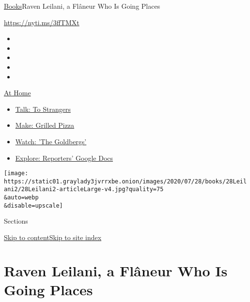 \href{/section/books}{Books}\textbar{}Raven Leilani, a Flâneur Who Is
Going Places

\url{https://nyti.ms/3ffTMXt}

\begin{itemize}
\item
\item
\item
\item
\item
\end{itemize}

\href{https://www.nytimes3xbfgragh.onion/spotlight/at-home?action=click\&pgtype=Article\&state=default\&region=TOP_BANNER\&context=at_home_menu}{At
Home}

\begin{itemize}
\tightlist
\item
  \href{https://www.nytimes3xbfgragh.onion/2020/08/03/well/family/the-benefits-of-talking-to-strangers.html?action=click\&pgtype=Article\&state=default\&region=TOP_BANNER\&context=at_home_menu}{Talk:
  To Strangers}
\item
  \href{https://www.nytimes3xbfgragh.onion/2020/08/01/at-home/coronavirus-make-pizza-on-a-grill.html?action=click\&pgtype=Article\&state=default\&region=TOP_BANNER\&context=at_home_menu}{Make:
  Grilled Pizza}
\item
  \href{https://www.nytimes3xbfgragh.onion/2020/07/31/arts/television/goldbergs-abc-stream.html?action=click\&pgtype=Article\&state=default\&region=TOP_BANNER\&context=at_home_menu}{Watch:
  'The Goldbergs'}
\item
  \href{https://www.nytimes3xbfgragh.onion/interactive/2020/at-home/even-more-reporters-editors-diaries-lists-recommendations.html?action=click\&pgtype=Article\&state=default\&region=TOP_BANNER\&context=at_home_menu}{Explore:
  Reporters' Google Docs}
\end{itemize}

\texttt{[image: https://static01.graylady3jvrrxbe.onion/images/2020/07/28/books/28Leilani2/28Leilani2-articleLarge-v4.jpg?quality=75\\\&auto=webp\\\&disable=upscale]}

Sections

\protect\hyperlink{site-content}{Skip to
content}\protect\hyperlink{site-index}{Skip to site index}

\hypertarget{raven-leilani-a-fluxe2neur-who-is-going-places}{%
\section{Raven Leilani, a Flâneur Who Is Going
Places}\label{raven-leilani-a-fluxe2neur-who-is-going-places}}

